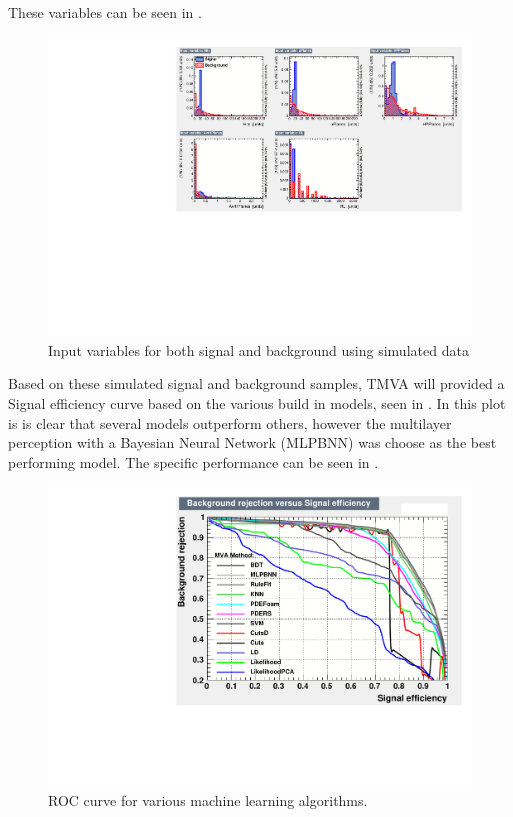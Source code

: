 These variables can be seen in .

\begin{figure}[h!]
\centering

\includegraphics[width=\textwidth]{figures/TMVA/inputvariables.pdf}
\caption{Input variables for both signal and background using simulated data}
\label{fig:TMVAinput}
\end{figure}

Based on these simulated signal and background samples, TMVA will provided a Signal efficiency curve based on the various build in models, seen in . In this plot is is clear that several models outperform others, however the multilayer perception with a Bayesian Neural Network (MLPBNN) was choose as the best performing model. The specific performance can be seen in .




\begin{figure}[h!]
\centering

\includegraphics[width=\textwidth]{figures/TMVA/roc12.pdf}
\caption{ROC curve for various machine learning algorithms.}
\label{fig:TMVAroc}
\end{figure}

